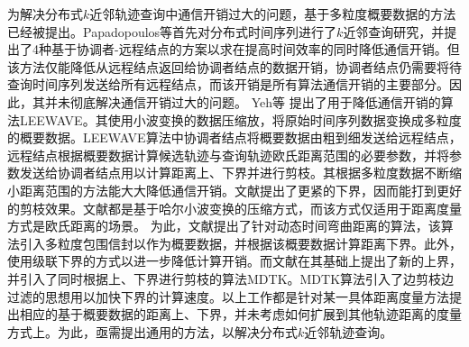 为解决分布式$k$近邻轨迹查询中通信开销过大的问题，基于多粒度概要数据的方法已经被提出\cite{PapadopoulosM01,LeeWave,DTKST,bandwidth,bandwidth}。Papadopoulos等\cite{PapadopoulosM01}首先对分布式时间序列进行了$k$近邻查询研究，并提出了4种基于协调者-远程结点的方案以求在提高时间效率的同时降低通信开销。但该方法仅能降低从远程结点返回给协调者结点的数据开销，协调者结点仍需要将待查询时间序列发送给所有远程结点，而该开销是所有算法通信开销的主要部分。因此，其并未彻底解决通信开销过大的问题。
Yeh等 \cite{LeeWave}提出了用于降低通信开销的算法LEEWAVE。其使用小波变换的数据压缩放，将原始时间序列数据变换成多粒度的概要数据。LEEWAVE算法中协调者结点将概要数据由粗到细发送给远程结点，远程结点根据概要数据计算候选轨迹与查询轨迹欧氏距离范围的必要参数，并将参数发送给协调者结点用以计算距离上、下界并进行剪枝。其根据多粒度数据不断缩小距离范围的方法能大大降低通信开销。文献\cite{KashyapK11,DTKST}提出了更紧的下界，因而能打到更好的剪枝效果。文献\cite{LeeWave,KashyapK11,DTKST}都是基于哈尔小波变换的压缩方式，而该方式仅适用于距离度量方式是欧氏距离的场景。
为此，文献\cite{bandwidth}提出了针对动态时间弯曲距离的算法，该算法引入多粒度包围信封以作为概要数据，并根据该概要数据计算距离下界。此外，使用级联下界的方式以进一步降低计算开销。而文献\cite{bandwidth}在其基础上提出了新的上界，并引入了同时根据上、下界进行剪枝的算法MDTK。MDTK算法引入了边剪枝边过滤的思想用以加快下界的计算速度。以上工作都是针对某一具体距离度量方法提出相应的基于概要数据的距离上、下界，并未考虑如何扩展到其他轨迹距离的度量方式上。为此，亟需提出通用的方法，以解决分布式$k$近邻轨迹查询。


\clearpage
\phantom{s}
\clearpage